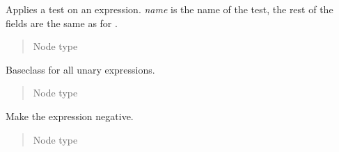 \documentclass[a4paper,10pt,english]{sphinxmanual}
\begin{document}

\begin{fulllineitems}
\label{extensions:jinja2.nodes.Test}
Applies a test on an expression.  \emph{name} is the name of the test, the
rest of the fields are the same as for {\hyperref[extensions:jinja2.nodes.Call]{}}.
\begin{quote}\begin{description}
\item[{Node type}] \leavevmode
{\hyperref[extensions:jinja2.nodes.Expr]{}}

\end{description}\end{quote}

\end{fulllineitems}


\begin{fulllineitems}
\label{extensions:jinja2.nodes.UnaryExpr}
Baseclass for all unary expressions.
\begin{quote}\begin{description}
\item[{Node type}] \leavevmode
{\hyperref[extensions:jinja2.nodes.Expr]{}}

\end{description}\end{quote}

\end{fulllineitems}


\begin{fulllineitems}
\label{extensions:jinja2.nodes.Neg}
Make the expression negative.
\begin{quote}\begin{description}
\item[{Node type}] \leavevmode
{\hyperref[extensions:jinja2.nodes.UnaryExpr]{}}

\end{description}\end{quote}

\end{fulllineitems}
\end{document}
